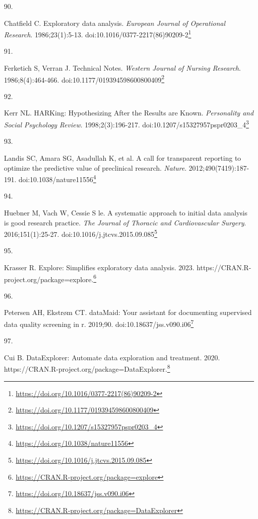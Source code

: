 \documentclass[
  a4paper,
]{book}
\newlength{\cslhangindent}
\newlength{\csllabelwidth}
\newlength{\cslentryspacingunit} %
\newenvironment{CSLReferences}[2] %
 {%
  \setlength{\parindent}{0pt}
  \ifodd #1
  \let\oldpar\par
  \def\par{\hangindent=\cslhangindent\oldpar}
  \fi
  \setlength{\parskip}{#2\cslentryspacingunit}
 }%
 {}
\newcommand{\CSLLeftMargin}[1]{\parbox[t]{\csllabelwidth}{#1}}
\newcommand{\CSLRightInline}[1]{\parbox[t]{\linewidth - \csllabelwidth}{#1}\break}
\renewcommand{\href}[2]{#2\footnote{\url{#1}}}
\begin{document}
\begin{CSLReferences}{0}{0}
\leavevmode{}%
\CSLLeftMargin{90. }%
\CSLRightInline{Chatfield C. Exploratory data analysis. \emph{European Journal of Operational Research}. 1986;23(1):5-13. doi:\href{https://doi.org/10.1016/0377-2217(86)90209-2}{10.1016/0377-2217(86)90209-2}}

\leavevmode{}%
\CSLLeftMargin{91. }%
\CSLRightInline{Ferketich S, Verran J. Technical Notes. \emph{Western Journal of Nursing Research}. 1986;8(4):464-466. doi:\href{https://doi.org/10.1177/019394598600800409}{10.1177/019394598600800409}}

\leavevmode{}%
\CSLLeftMargin{92. }%
\CSLRightInline{Kerr NL. HARKing: Hypothesizing After the Results are Known. \emph{Personality and Social Psychology Review}. 1998;2(3):196-217. doi:\href{https://doi.org/10.1207/s15327957pspr0203_4}{10.1207/s15327957pspr0203\_4}}

\leavevmode{}%
\CSLLeftMargin{93. }%
\CSLRightInline{Landis SC, Amara SG, Asadullah K, et al. A call for transparent reporting to optimize the predictive value of preclinical research. \emph{Nature}. 2012;490(7419):187-191. doi:\href{https://doi.org/10.1038/nature11556}{10.1038/nature11556}}

\leavevmode{}%
\CSLLeftMargin{94. }%
\CSLRightInline{Huebner M, Vach W, Cessie S le. A systematic approach to initial data analysis is good research practice. \emph{The Journal of Thoracic and Cardiovascular Surgery}. 2016;151(1):25-27. doi:\href{https://doi.org/10.1016/j.jtcvs.2015.09.085}{10.1016/j.jtcvs.2015.09.085}}

\leavevmode{}%
\CSLLeftMargin{95. }%
\CSLRightInline{Krasser R. Explore: Simplifies exploratory data analysis. 2023. \href{https://CRAN.R-project.org/package=explore}{https://CRAN.R-project.org/package=explore.}}

\leavevmode{}%
\CSLLeftMargin{96. }%
\CSLRightInline{Petersen AH, Ekstrøm CT. {\textbraceleft}dataMaid{\textbraceright}: Your assistant for documenting supervised data quality screening in {\textbraceleft}r{\textbraceright}. 2019;90. doi:\href{https://doi.org/10.18637/jss.v090.i06}{10.18637/jss.v090.i06}}

\leavevmode{}%
\CSLLeftMargin{97. }%
\CSLRightInline{Cui B. DataExplorer: Automate data exploration and treatment. 2020. \href{https://CRAN.R-project.org/package=DataExplorer}{https://CRAN.R-project.org/package=DataExplorer.}}


\end{CSLReferences}
\end{document}
